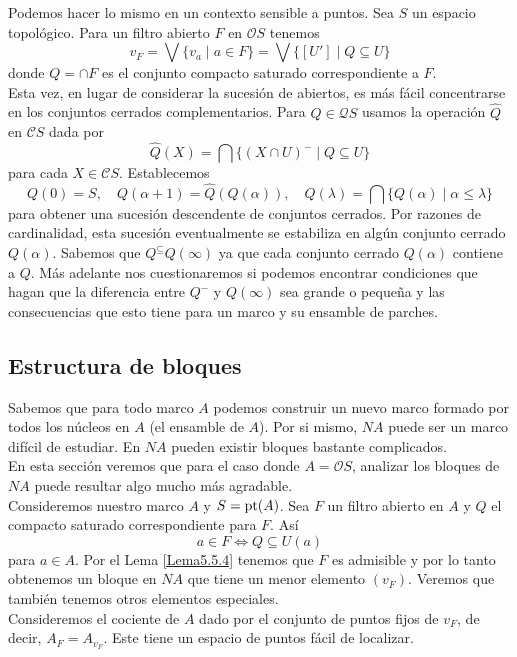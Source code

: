 Podemos hacer lo mismo en un contexto sensible a puntos. Sea $S$ un espacio topológico. Para un filtro abierto $F$ en $\mathcal{O}S$ tenemos 
\[
v_F=\bigvee\{v_a\mid a\in F\}=\bigvee\{[U']\mid Q\subseteq U\}
\]
donde $Q=\cap F$ es el conjunto compacto saturado correspondiente a $F$.\\

Esta vez, en lugar de considerar la sucesión de abiertos, es más fácil concentrarse en los conjuntos cerrados complementarios. Para $Q\in \mathcal{Q}S$ usamos la operación $\hat{Q}$ en $\mathcal{C}S$ dada por 
\[
\hat{Q}(X)=\bigcap\{(X\cap U)^-\mid Q\subseteq U\}
\]
para cada $X\in \mathcal{C}S$. Establecemos
\[
Q(0)=S,\quad Q(\alpha +1)=\hat{Q}(Q(\alpha)), \quad Q(\lambda)=\bigcap\{Q(\alpha)\mid \alpha\leq \lambda\}
\]
para obtener una sucesión descendente de conjuntos cerrados. Por razones de cardinalidad, esta sucesión eventualmente se estabiliza en algún conjunto cerrado $Q(\alpha)$. Sabemos que $Q^\subseteq Q(\infty)$ ya que cada conjunto cerrado $Q(\alpha)$ contiene a $Q$. Más adelante nos cuestionaremos si podemos encontrar condiciones que hagan que la diferencia entre $Q^-$ y $Q(\infty)$ sea grande o pequeña y las consecuencias que esto tiene para un marco y su ensamble de parches.

\subsection{Estructura de bloques}\label{Estructura de bloques}

Sabemos que para todo marco $A$ podemos construir un nuevo marco formado por todos los núcleos en $A$ (el ensamble de $A$). Por si mismo, $NA$ puede ser un marco difícil de estudiar. En $NA$ pueden existir bloques bastante complicados.\\

En esta sección veremos que para el caso donde $A=\mathcal{O}S$, analizar los bloques de $NA$ puede resultar algo mucho más agradable.\\

Consideremos nuestro marco $A$ y $S=\mathrm{pt}(A)$. Sea $F$ un filtro abierto en $A$ y $Q$ el compacto saturado correspondiente para $F$. Así 
\[
a\in F\Leftrightarrow Q\subseteq U(a)
\]
para $a\in A$. Por el Lema \ref{Lema5.5.4} tenemos que $F$ es admisible y por lo tanto obtenemos un bloque en $NA$ que tiene un menor elemento $(v_F)$. Veremos que también tenemos otros elementos especiales.\\

Consideremos el cociente de $A$ dado por el conjunto de puntos fijos de $v_F$, de decir, $A_F=A_{v_F}$. Este tiene un espacio de puntos fácil de localizar.

